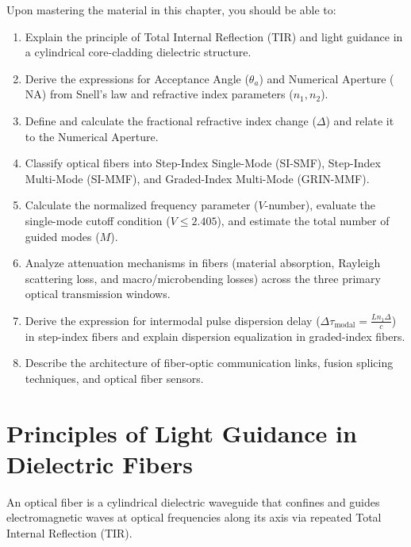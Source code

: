 \begin{important}
Upon mastering the material in this chapter, you should be able to:
\begin{enumerate}
    \item Explain the principle of Total Internal Reflection (TIR) and light guidance in a cylindrical core-cladding dielectric structure.
    \item Derive the expressions for Acceptance Angle ($\theta_a$) and Numerical Aperture ($\text{NA}$) from Snell's law and refractive index parameters ($n_1, n_2$).
    \item Define and calculate the fractional refractive index change ($\Delta$) and relate it to the Numerical Aperture.
    \item Classify optical fibers into Step-Index Single-Mode (SI-SMF), Step-Index Multi-Mode (SI-MMF), and Graded-Index Multi-Mode (GRIN-MMF).
    \item Calculate the normalized frequency parameter ($V$-number), evaluate the single-mode cutoff condition ($V \le 2.405$), and estimate the total number of guided modes ($M$).
    \item Analyze attenuation mechanisms in fibers (material absorption, Rayleigh scattering loss, and macro/microbending losses) across the three primary optical transmission windows.
    \item Derive the expression for intermodal pulse dispersion delay ($\Delta \tau_{\text{modal}} = \frac{L n_1 \Delta}{c}$) in step-index fibers and explain dispersion equalization in graded-index fibers.
    \item Describe the architecture of fiber-optic communication links, fusion splicing techniques, and optical fiber sensors.
\end{enumerate}
\end{important}

\section{Principles of Light Guidance in Dielectric Fibers}

An optical fiber is a cylindrical dielectric waveguide that confines and guides electromagnetic waves at optical frequencies along its axis via repeated Total Internal Reflection (TIR).

